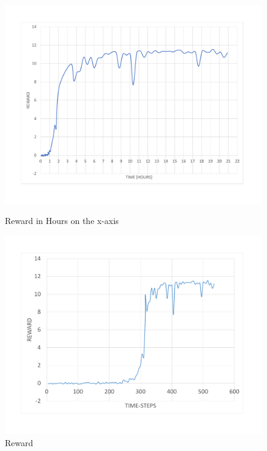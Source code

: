 \begin{figure}[H]
	\includegraphics[width=\linewidth]{Figures/Result/reward_in_hours_best.pdf}
	\caption{Reward in Hours on the x-axis}\label{fig:RewardHours}
	\endminipage\hfill
	\includegraphics[width=\textwidth]{Figures/Reward}
	\caption{Reward}
	\label{fig:Reward}
	\endminipage
\end{figure}
